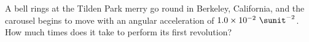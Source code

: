 A bell rings at the Tilden Park merry go round in Berkeley, California,
and the carousel begins to move with an angular acceleration of
$1.0\times10^{-2}\ \sunit^{-2}$. How much times does it take to perform
its first revolution?\answercheck

